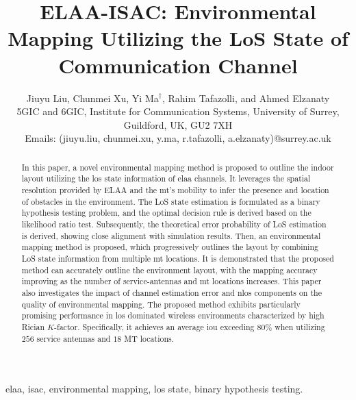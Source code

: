 \documentclass[conference, a4paper]{IEEEtran}
\begin{document}
\title{ELAA-ISAC: Environmental Mapping Utilizing the LoS State of Communication Channel}
\author{Jiuyu Liu, Chunmei Xu, Yi Ma$^\dag$, Rahim Tafazolli, and Ahmed Elzanaty\\
	{\small 5GIC and 6GIC, Institute for Communication Systems, University of Surrey, Guildford, UK, GU2 7XH}\\
	{\small Emails: (jiuyu.liu, chunmei.xu, y.ma, r.tafazolli, a.elzanaty)@surrey.ac.uk}}
\markboth{}%
{}

\maketitle

\begin{abstract}
In this paper, a novel environmental mapping method is proposed to outline the indoor layout utilizing the \gls{los} state information of \gls{elaa} channels.
It leverages the spatial resolution provided by ELAA and the \gls{mt}'s mobility to infer the presence and location of obstacles in the environment.
The LoS state estimation is formulated as a binary hypothesis testing problem, and the optimal decision rule is derived based on the likelihood ratio test.
Subsequently, the theoretical error probability of LoS estimation is derived, showing close alignment with simulation results.
Then, an environmental mapping method is proposed, which progressively outlines the layout by combining LoS state information from multiple \gls{mt} locations.
It is demonstrated that the proposed method can accurately outline the environment layout, with the mapping accuracy improving as the number of service-antennas and \gls{mt} locations increases.
This paper also investigates the impact of channel estimation error and \gls{nlos} components on the quality of environmental mapping.
The proposed method exhibits particularly promising performance in \gls{los} dominated wireless environments characterized by high Rician $K$-factor. 
Specifically, it achieves an average \gls{iou} exceeding $80\%$ when utilizing $256$ service antennas and $18$ MT locations.
\end{abstract}                                                                           \glsresetall
                       
\begin{IEEEkeywords}
\Gls{elaa}, \gls{isac}, environmental mapping, \gls{los} state, binary hypothesis testing.
\end{IEEEkeywords}
\glsresetall
\end{document}
